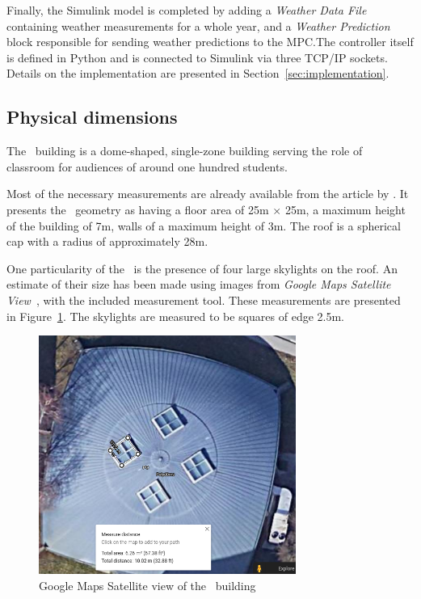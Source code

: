 \clearpage

Finally, the  Simulink model is completed by adding a \textit{Weather Data File}
containing weather measurements for a whole year, and a \textit{Weather
Prediction} block responsible for sending weather predictions to the MPC.\@ The
controller itself is defined in Python and is connected to Simulink via three
TCP/IP sockets. Details on the implementation are presented in
Section~\ref{sec:implementation}.

\subsection{Physical dimensions}\label{sec:Physical_dimensions}

The \pdome\ building is a dome-shaped, single-zone building serving the role
of classroom for audiences of around one hundred students.

Most of the necessary measurements are already available from the
 article by
\textcite{nattererPolydomeTimberShell1993}. It presents the \pdome\ geometry as
having a floor area of 25m $\times$ 25m, a maximum height of the building of 7m,
walls of a maximum height of 3m. The roof is a spherical cap with a radius of
approximately 28m.

One particularity of the \pdome\  is the presence of four large skylights on the
roof. An estimate of their size has been made using images from \textit{Google
Maps Satellite View}~\cite{GoogleMaps}, with the included measurement tool. These
measurements are presented in Figure~\ref{fig:Google_Maps_Skylights}. The
skylights are measured to be squares of edge 2.5m.

\begin{figure}[ht]
    \centering
    \vspace{-10pt}
    \includegraphics[width = 0.75\textwidth]{Images/google_maps_polydome_skylights}
    \caption{Google Maps Satellite view of the \pdome\ building}
    \label{fig:Google_Maps_Skylights}
\end{figure}


